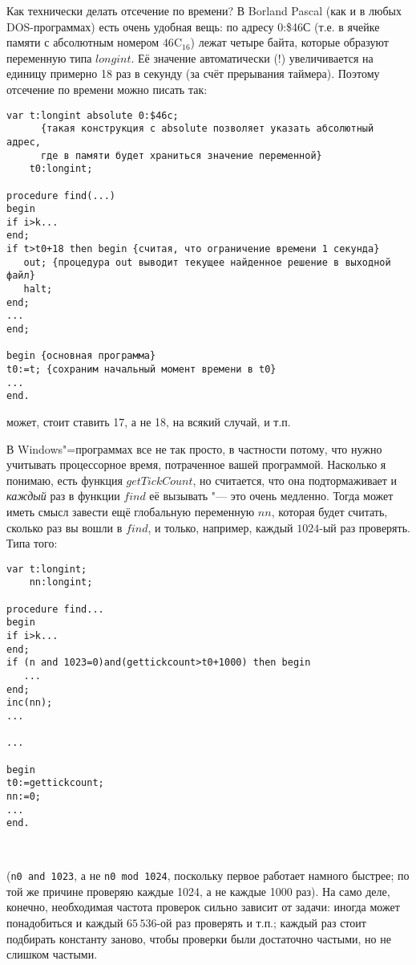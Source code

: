 Как технически делать отсечение по времени? В Borland Pascal (как и в 
любых DOS-программах) есть очень удобная вещь: по адресу 0:\$46С (т.е. в ячейке памяти с абсолютным номером $46\mathrm C_{16}$) лежат четыре 
байта, которые образуют переменную типа $longint$. Её значение автоматически (!)
увеличивается на единицу примерно 18 раз в секунду (за счёт прерывания 
таймера). Поэтому отсечение по времени можно писать так:
\begin{codesampleo}\begin{verbatim}
var t:longint absolute 0:$46c; 
      {такая конструкция с absolute позволяет указать абсолютный адрес, 
      где в памяти будет храниться значение переменной}
    t0:longint;
    
procedure find(...)
begin
if i>k...
end;
if t>t0+18 then begin {считая, что ограничение времени 1 секунда}
   out; {процедура out выводит текущее найденное решение в выходной файл}
   halt;
end;
...
end;

begin {основная программа}
t0:=t; {сохраним начальный момент времени в t0}
...
end.
\end{verbatim}
\end{codesampleo}
может, стоит ставить 17, а не 18, на всякий случай, и т.п.

В Windows"=программах все не так просто, в частности потому, что нужно учитывать 
процессорное время, потраченное вашей программой. Насколько я понимаю, есть 
функция $getTickCount$, но считается, что она подтормаживает и \textit{каждый} раз 
в функции $find$ её вызывать "--- это очень медленно. Тогда может иметь смысл 
завести ещё глобальную переменную $nn$, которая будет считать, сколько раз вы 
вошли в $find$, и только, например, каждый $1024$-ый раз проверять. Типа того:

\begin{codesample}\begin{verbatim}
var t:longint;
    nn:longint;
    
procedure find...
begin
if i>k...
end;
if (n and 1023=0)and(gettickcount>t0+1000) then begin
   ...
end;
inc(nn);
...

...

begin
t0:=gettickcount;
nn:=0;
...
end.



\end{verbatim}
\end{codesample}

(\texttt{n0 and 1023}, а не \texttt{n0 mod 1024}, поскольку первое работает намного быстрее; по той же причине проверяю каждые 1024, а не каждые 1000 раз). На само деле, конечно, необходимая частота проверок сильно зависит от задачи: иногда может понадобиться и каждый $65\,536$-ой раз проверять и т.п.; каждый раз стоит подбирать константу заново, чтобы проверки были достаточно частыми, но не слишком частыми.
 
